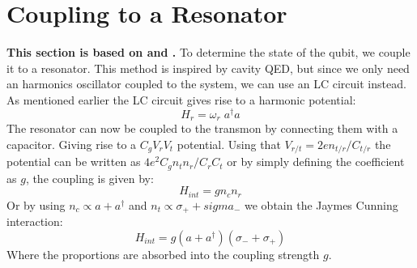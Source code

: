 \section{Coupling to a Resonator}
\textbf{This section is based on \cite{boissonneault_dispersive_2009} and \cite{boissonneault_improved_2010}.} 
To determine the state of the qubit, we couple it to a resonator. This method is inspired by cavity QED, but since we only need an harmonics oscillator coupled to the system, we can use an LC circuit instead. As mentioned earlier the LC circuit gives rise to a harmonic potential:
\begin{equation}
    H_r = \omega_r \; a^\dagger a
\end{equation}
The resonator can now be coupled to the transmon by connecting them with a capacitor. Giving rise to a $C_g V_r V_t$ potential. Using that $V_{r/t} = 2e n_{t/r} / C_{t/r}$ the potential can be written as $4e^2C_g  n_t n_r / C_r C_t$ or by simply defining the coefficient as $g$, the coupling is given by:
\begin{equation}
    H_{int} = g n_c n_r 
\end{equation}
Or by using $n_c \propto a + a^\dagger$ and $n_t \propto \sigma_+ + sigma_-$ we obtain the Jaymes Cunning interaction:
\begin{equation}
    H_{int} = g (a + a^\dagger) (\sigma_- + \sigma_+)
\end{equation}
Where the proportions are absorbed into the coupling strength $g$. 


